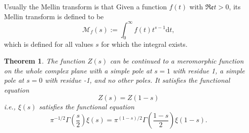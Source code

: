 \documentclass[12pt,a4paper,english]{article}
\theoremstyle{plain}
\newtheorem{thm}{Theorem}[section]
\theoremstyle{definition}
\begin{document}
Usually the Mellin transform is that Given a function $f(t)$ with $\mathfrak{Re}t>0$, its Mellin transform is defined to be
\begin{equation*}
    \mathcal{M}_{f}(s):=\int^{\infty}_{0}f(t)t^{s-1}\text{d}t,
\end{equation*}
which is defined for all values $s$ for which the integral exists.
\begin{thm}
The function $Z(s)$ can be continued to a meromorphic function on the whole complex plane with a simple pole at $s=1$ with residue 1, a simple pole at $s=0$ with residue -1, and no other poles. It satisfies the functional equation 
\begin{equation*}
        Z(s)=Z(1-s)
\end{equation*}
i.e., $\xi(s)$ satisfies the functional equation
\begin{equation*}        \pi^{-1/2}\Gamma(\frac{s}{2})\xi(s)=\pi^{(1-s)/2}\Gamma(\frac{1-s}{2})\xi(1-s).
\end{equation*}
\end{thm}
\end{document}
